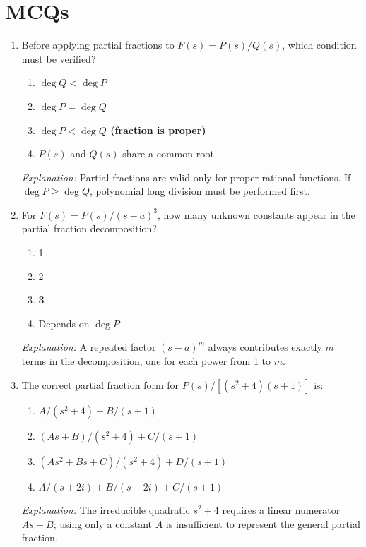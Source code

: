 \documentclass[12pt,a4paper]{article}
\begin{document}
\section{MCQs}

\begin{enumerate}[label=\textbf{\arabic*.}, leftmargin=*, itemsep=1.2em]

\item Before applying partial fractions to $F(s)=P(s)/Q(s)$, which
  condition must be verified?
  \begin{enumerate}[label=(\alph*)]
    \item $\deg Q < \deg P$
    \item $\deg P = \deg Q$
    \item \textbf{$\deg P < \deg Q$ (fraction is proper)}
    \item $P(s)$ and $Q(s)$ share a common root
  \end{enumerate}
  \textit{Explanation:} Partial fractions are valid only for proper rational
  functions. If $\deg P \geq \deg Q$, polynomial long division must be
  performed first.

\item For $F(s)=P(s)/(s-a)^3$, how many unknown constants appear in the
  partial fraction decomposition?
  \begin{enumerate}[label=(\alph*)]
    \item 1
    \item 2
    \item \textbf{3}
    \item Depends on $\deg P$
  \end{enumerate}
  \textit{Explanation:} A repeated factor $(s-a)^m$ always contributes exactly
  $m$ terms in the decomposition, one for each power from 1 to $m$.

\item The correct partial fraction form for $P(s)/[(s^2+4)(s+1)]$ is:
  \begin{enumerate}[label=(\alph*)]
    \item $A/(s^2+4)+B/(s+1)$
    \item \textbf{$(As+B)/(s^2+4)+C/(s+1)$}
    \item $(As^2+Bs+C)/(s^2+4)+D/(s+1)$
    \item $A/(s+2i)+B/(s-2i)+C/(s+1)$
  \end{enumerate}
  \textit{Explanation:} The irreducible quadratic $s^2+4$ requires a
  linear numerator $As+B$; using only a constant $A$ is insufficient to
  represent the general partial fraction.


\end{enumerate}
\end{document}
